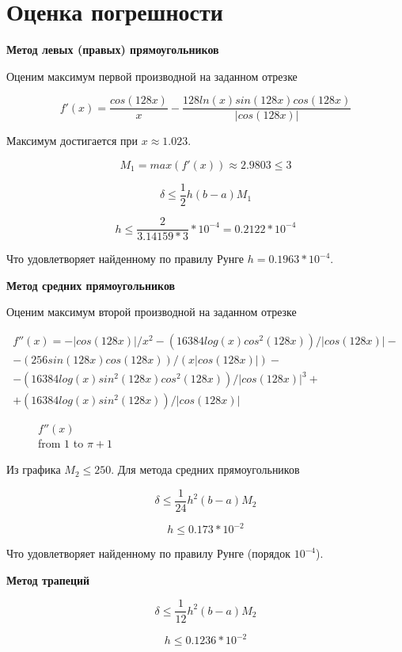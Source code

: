 \documentclass[a4paper,11pt]{article}
\begin{document}
\section{Оценка погрешности}

\textbf{Метод левых (правых) прямоугольников}

Оценим максимум первой производной на заданном отрезке

$$
f'(x) = \frac{cos(128x)}{x} - \frac{128ln(x)sin(128x)cos(128x)}{|cos(128x)|}
$$

Максимум достигается при $x \approx 1.023$.

$$
M_1 = max(f'(x)) \approx 2.9803 \le 3
$$

$$
\delta \le \frac{1}{2} h (b - a) M_1
$$

$$
h \le \frac{2}{3.14159 * 3} * 10^{-4} = 0.2122 * 10^{-4}
$$

Что удовлетворяет найденному по правилу Рунге $h = 0.1963 * 10^{-4}$.

\textbf{Метод средних прямоугольников}

Оценим максимум второй производной на заданном отрезке

\begin{equation}
\begin{split}
f''(x) = -|cos(128 x)|/x^2 - (16384 log(x) cos^2(128 x))/|cos(128 x)| - \\
- (256 sin(128 x) cos(128 x))/(x |cos(128 x)|) - \\
- (16384 log(x) sin^2(128 x) cos^2(128 x))/|cos(128 x)|^3 + \\
+ (16384 log(x) sin^2(128 x))/|cos(128 x)|
\end{split}
\end{equation}

\begin{figure}[ht]
    
    \caption{$ f''(x) $ \\ from $1$ to $\pi+1$ }
\end{figure}

Из графика $M_2 \le 250$. Для метода средних прямоугольников

$$
\delta \le \frac{1}{24} h^2 (b - a) M_2
$$

$$
h \le 0.173 * 10^{-2}
$$

Что удовлетворяет найденному по правилу Рунге (порядок $10^{-4}$).

\textbf{Метод трапеций}

$$
\delta \le \frac{1}{12} h^2 (b - a) M_2
$$

$$
h \le 0.1236 * 10^{-2}
$$
\end{document}
